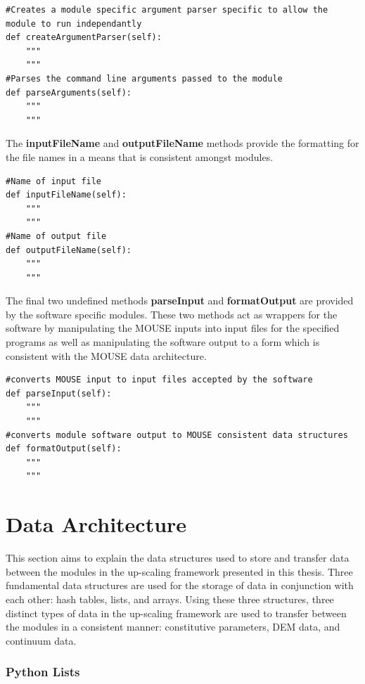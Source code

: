\begin{lstlisting}[frame=single] 
#Creates a module specific argument parser specific to allow the module to run independantly   
def createArgumentParser(self):
	"""
	"""
#Parses the command line arguments passed to the module
def parseArguments(self):
	"""
	"""
\end{lstlisting}

The \textbf{inputFileName} and \textbf{outputFileName} methods provide the formatting for the file names in a means that is consistent amongst modules.

\begin{lstlisting}[frame=single]
#Name of input file
def inputFileName(self):
	"""
	"""
#Name of output file
def outputFileName(self):
	"""
	"""
\end{lstlisting}

The final two undefined methods \textbf{parseInput} and \textbf{formatOutput} are provided by the software specific modules. These two methods act as wrappers for the software by manipulating the MOUSE inputs into input files for the specified programs as well as manipulating the software output to a form which is consistent with the MOUSE data architecture.

\begin{lstlisting}[frame=single]
#converts MOUSE input to input files accepted by the software
def parseInput(self):
	"""
	"""
#converts module software output to MOUSE consistent data structures
def formatOutput(self):
	"""
	"""
\end{lstlisting}

\section{Data Architecture}

This section aims to explain the data structures used to store and transfer data between the modules in the up-scaling framework presented in this thesis.  Three fundamental data structures are used for the storage of data in conjunction with each other: hash tables, lists, and arrays. Using these three structures, three distinct types of data in the up-scaling framework are used to transfer between the modules in a consistent manner: constitutive parameters, DEM data, and continuum data.

\subsubsection*{Python Lists}

